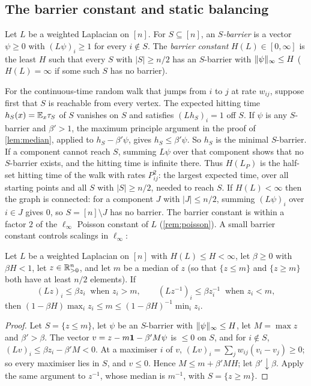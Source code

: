 \subsection{The barrier constant and static balancing}

\begin{definition}\label{def:barrier}
Let $L$ be a weighted Laplacian on $[n]$. For $S\subseteq[n]$, an
\emph{$S$-barrier} is a vector $\psi\ge0$ with $(L\psi)_i\ge1$ for every
$i\notin S$. The \emph{barrier constant} $H(L)\in[0,\infty]$ is the least $H$ such
that every $S$ with $|S|\ge n/2$ has an $S$-barrier with $\lVert \psi\rVert_\infty\le H$
($H(L)=\infty$ if some such $S$ has no barrier).
\end{definition}

For the continuous-time random walk that jumps from $i$ to $j$ at rate
$w_{ij}$, suppose first that $S$ is reachable from every vertex. The expected
hitting time $h_S(x)=\mathbb E_x\tau_S$ of $S$ vanishes on $S$
and satisfies $(Lh_S)_i=1$ off $S$. If $\psi$ is any $S$-barrier and $\beta'>1$,
the maximum principle argument in the proof of \cref{lem:median}, applied to
$h_S-\beta'\psi$, gives $h_S\le\beta'\psi$. So $h_S$ is the minimal $S$-barrier.
If a component cannot reach $S$, summing $L\psi$ over that component shows
that no $S$-barrier exists, and the hitting time is infinite there. Thus
$H(L_P)$ is the half-set hitting time of the walk with rates $P_{ij}^2$: the
largest expected time, over all starting points and all $S$ with $|S|\ge n/2$,
needed to reach $S$. If $H(L)<\infty$ then the graph is connected: for a
component $J$ with $|J|\le n/2$, summing $(L\psi)_i$ over $i\in J$ gives $0$, so
$S=[n]\setminus J$ has no barrier. The barrier constant is within a factor $2$ of
the $\ell_\infty$ Poisson constant of $L$ (\cref{rem:poisson}). A small barrier
constant controls scalings in $\ell_\infty$:

\begin{lemma}\label{lem:median}
Let $L$ be a weighted Laplacian on $[n]$ with $H(L)\le H<\infty$, let $\beta\ge0$ with $\beta H<1$, let
$z\in\mathbb R^n_{>0}$, and let $m$ be a median of $z$ (so that $\{z\le m\}$ and
$\{z\ge m\}$ both have at least $n/2$ elements). If
\[
 (Lz)_i\le\beta z_i\ \text{ when }z_i>m,\qquad
 (Lz^{-1})_i\le\beta z_i^{-1}\ \text{ when }z_i<m ,
\]
then $(1-\beta H)\max_iz_i\le m\le(1-\beta H)^{-1}\min_iz_i$.
\end{lemma}

\begin{proof}
Let $S=\{z\le m\}$, let $\psi$ be an $S$-barrier with $\lVert \psi\rVert_\infty\le H$, let
$M=\max z$ and $\beta'>\beta$. The vector $v=z-m\mathbf 1-\beta'M\psi$ is $\le0$ on
$S$, and for $i\notin S$, $(Lv)_i\le\beta z_i-\beta'M<0$. At a maximiser $i$ of
$v$, $(Lv)_i=\sum_jw_{ij}(v_i-v_j)\ge0$; so every maximiser lies in $S$, and
$v\le0$. Hence $M\le m+\beta'MH$; let $\beta'\downarrow\beta$. Apply the same
argument to $z^{-1}$, whose median is $m^{-1}$, with $S=\{z\ge m\}$.
\end{proof}

